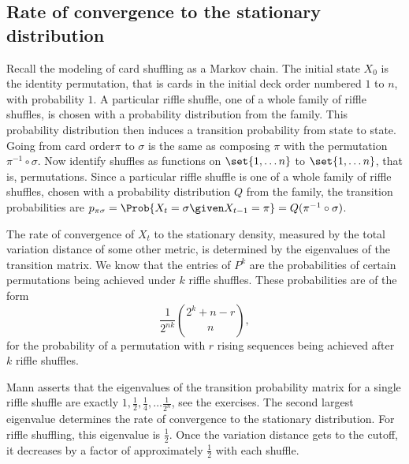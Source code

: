 \documentclass[12pt]{article}
\begin{document}
\subsection*{Rate of convergence to the stationary distribution}

Recall the modeling of card shuffling as a Markov chain.  The initial
state \( X_0 \) is the identity permutation, that is cards in the
initial deck order numbered \( 1 \) to \( n \), with probability \( 1 \).
A particular riffle shuffle, one of a whole family of riffle shuffles,
is chosen with a probability distribution from the family. This
probability distribution then induces a transition probability from
state to state.  Going from card order\( \pi \) to \( \sigma \) is the
same as composing \( \pi \) with the permutation \( \pi^{-1} \circ \sigma \).
Now identify shuffles as functions on \( \set{1, \dots n} \) to \( \set{1,
\dots n} \), that is, permutations.  Since a particular riffle shuffle
is one of a whole family of riffle shuffles, chosen with a probability
distribution \( Q \) from the family, the transition probabilities are \(
p_{\pi \sigma} = \Prob{X_t = \sigma \given X_{t-1} = \pi} = Q(\pi^{-1} \circ
\sigma) \).

The rate of convergence of \( X_t \) to the stationary density, measured
by the total variation distance of some other metric, is determined by
the eigenvalues of the transition matrix.  We know that the entries of \(
P^k \) are the probabilities of certain permutations being achieved
under \( k \) riffle shuffles.  These probabilities are of the form
\[
    \frac{1}{2^{nk}} \binom{2^k +n - r}{n},
\] for the probability of a permutation with \( r \) rising sequences
being achieved after \( k \) riffle shuffles.

Mann
\cite{mann94} asserts that the eigenvalues of the transition probability
matrix for a single riffle shuffle are exactly \( 1, \frac{1}{2}, \frac{1}
{4}, \dots \frac{1}{2^n} \), see the exercises.  The second largest
eigenvalue determines the rate of convergence to the stationary
distribution.  For riffle shuffling, this eigenvalue is \( \frac{1}{2} \).
Once the variation distance gets to the cutoff, it decreases by a factor
of approximately \( \frac{1}{2} \) with each shuffle.
\end{document}
